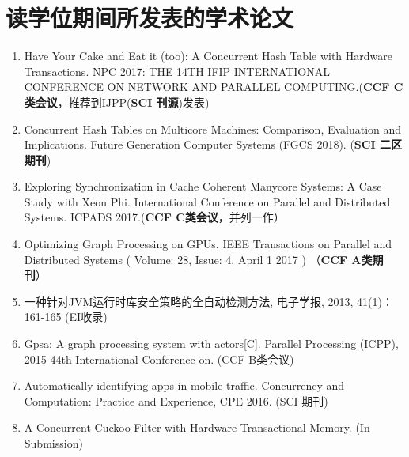 \chapter{读学位期间所发表的学术论文}

\begin{enumerate}
\item Have Your Cake and Eat it (too): A Concurrent Hash Table with Hardware Transactions. NPC 2017: THE 14TH IFIP INTERNATIONAL CONFERENCE ON NETWORK AND PARALLEL COMPUTING.(\textbf{CCF C类会议}，推荐到IJPP(\textbf{SCI 刊源})发表)
\item Concurrent Hash Tables on Multicore Machines: Comparison, Evaluation and Implications. Future Generation Computer Systems (FGCS 2018). (\textbf{SCI 二区期刊})
\item Exploring Synchronization in Cache Coherent Manycore Systems: A Case Study with Xeon Phi. International Conference on Parallel and Distributed Systems. ICPADS 2017.(\textbf{CCF C类会议}，并列一作）
\item Optimizing Graph Processing on GPUs. IEEE Transactions on Parallel and Distributed Systems ( Volume: 28, Issue: 4, April 1 2017 ) （\textbf{CCF A类期刊}）
\item 一种针对JVM运行时库安全策略的全自动检测方法, 电子学报, 2013, 41(1)：161-165 (EI收录)
\item Gpsa: A graph processing system with actors[C]. Parallel Processing (ICPP), 2015 44th International Conference on. (CCF B类会议)
\item Automatically identifying apps in mobile traffic. Concurrency and Computation: Practice and Experience, CPE 2016. (SCI 期刊)
\item A Concurrent Cuckoo Filter with Hardware Transactional Memory. (In Submission)
\end{enumerate}


